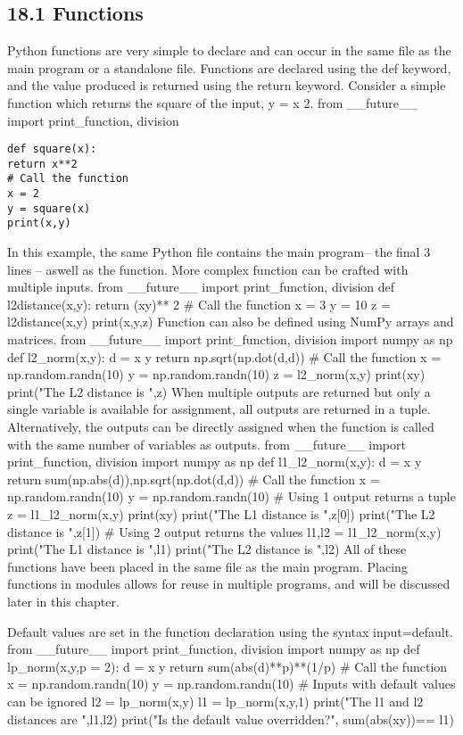 \subsection{18.1 Functions}
Python functions are very simple to declare and can occur in the same file as the main program or a standalone
file. Functions are declared using the def keyword, and the value produced is returned using the
return keyword. Consider a simple function which returns the square of the input, y = x 2.
from __future__ import print_function, division
\begin{verbatim}
def square(x):
return x**2
# Call the function
x = 2
y = square(x)
print(x,y)
\end{verbatim}
In this example, the same Python file contains the main program– the final 3 lines – aswell as the function.
More complex function can be crafted with multiple inputs.
from __future__ import print_function, division
def l2distance(x,y):
return (xy)**
2
# Call the function
x = 3
y = 10
z = l2distance(x,y)
print(x,y,z)
Function can also be defined using NumPy arrays and matrices.
from __future__ import print_function, division
import numpy as np
def l2_norm(x,y):
d = x y
return np.sqrt(np.dot(d,d))
# Call the function
x = np.random.randn(10)
y = np.random.randn(10)
z = l2_norm(x,y)
print(xy)
print("The L2 distance is ",z)
When multiple outputs are returned but only a single variable is available for assignment, all outputs are
returned in a tuple. Alternatively, the outputs can be directly assigned when the function is called with
the same number of variables as outputs.
from __future__ import print_function, division
import numpy as np
def l1_l2_norm(x,y):
d = x y
return sum(np.abs(d)),np.sqrt(np.dot(d,d))
# Call the function
x = np.random.randn(10)
y = np.random.randn(10)
# Using 1 output returns a tuple
z = l1_l2_norm(x,y)
print(xy)
print("The L1 distance is ",z[0])
print("The L2 distance is ",z[1])
# Using 2 output returns the values
l1,l2 = l1_l2_norm(x,y)
print("The L1 distance is ",l1)
print("The L2 distance is ",l2)
All of these functions have been placed in the same file as the main program. Placing functions in modules
allows for reuse in multiple programs, and will be discussed later in this chapter.


Default values are set in the function declaration using the syntax input=default.
from __future__ import print_function, division
import numpy as np
def lp_norm(x,y,p = 2):
d = x y
return sum(abs(d)**p)**(1/p)
# Call the function
x = np.random.randn(10)
y = np.random.randn(10)
# Inputs with default values can be ignored
l2 = lp_norm(x,y)
l1 = lp_norm(x,y,1)
print("The l1 and l2 distances are ",l1,l2)
print("Is the default value overridden?", sum(abs(xy))==
l1)

